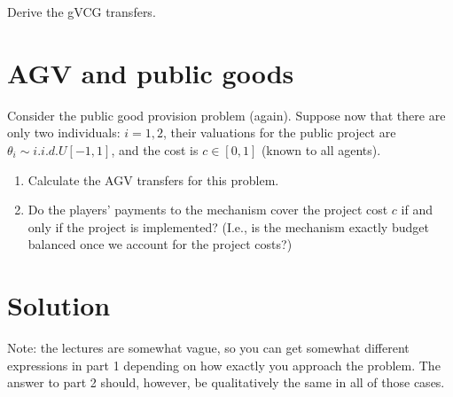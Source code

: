 \documentclass[a4paper]{article}
\newif\ifsolutions
\begin{document}
Derive the gVCG transfers.

\ifsolutions
\section*{Solution}
LCT for any $i$ is $\tilde{\theta}_i = -\hat{\theta}$ (you do not actually need to calculate the expectation to find it, since the expression that $\tilde{\theta}_i$ minimizes is weakly monotone in $\theta_i$ -- i.e., one of the edges of the support is the solution). The gVCG transfers are then given by
\begin{align*}
	t_i^{gVCG}(\theta) &= \max \left\{0, \sum_{j\neq i}\theta_j -\hat{\theta} - c \right\} - \left(\sum_{j\neq i}\theta_j -c\right) \cdot \mathbb{I} \left\{ \sum_{j=1}^N \theta_j - c > 0 \right\}
	\\
	&= \begin{cases}
		0	&	\text{ if } \sum_{j=1}^N \theta_j - c \leq 0,
		\\
		-\left(\sum_{j\neq i}\theta_j - c \right)	&	\text{ if }	\sum_{j\neq i} \theta_j - \hat{\theta} - c \leq 0 < \sum_{j=1}^N \theta_j - c,
		\\
		-\hat{\theta}	&	\text{ if } \sum_{j\neq i}\theta_j -\hat{\theta} - c > 0.
	\end{cases}
\end{align*}
\fi



\section{AGV and public goods}

Consider the public good provision problem (again). Suppose now that there are only two individuals: $i=1,2$, their valuations for the public project are $\theta_i \sim i.i.d. U[-1,1]$, and the cost is $c \in [0,1]$ (known to all agents).

\begin{enumerate}
	\item Calculate the AGV transfers for this problem.
	\item Do the players' payments to the mechanism cover the project cost $c$ if and only if the project is implemented? (I.e., is the mechanism exactly budget balanced once we account for the project costs?)
\end{enumerate}

\ifsolutions
\section*{Solution}
Note: the lectures are somewhat vague, so you can get somewhat different expressions in part 1 depending on how exactly you approach the problem. The answer to part 2 should, however, be qualitatively the same in all of those cases.
\end{document}
